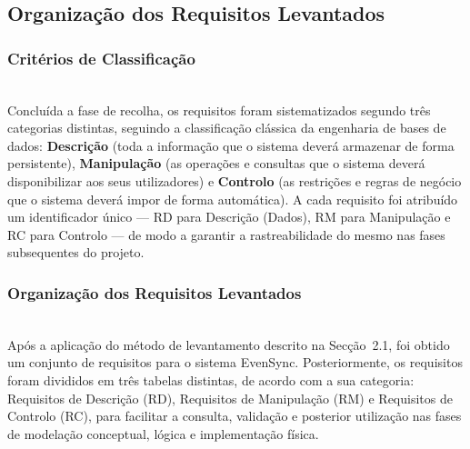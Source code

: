 \documentclass[runningheads]{llncs}
\begin{document}
                \newpage
                \subsection{Organização dos Requisitos Levantados}

                \subsubsection{Critérios de Classificação}\mbox{}\\

                Concluída a fase de recolha, os requisitos foram sistematizados segundo três categorias distintas,
                seguindo a classificação clássica da engenharia de bases de dados: \textbf{Descrição} (toda a informação
                que o sistema deverá armazenar de forma persistente), \textbf{Manipulação} (as operações e
                consultas que o sistema deverá disponibilizar aos seus utilizadores) e \textbf{Controlo}
                (as restrições e regras de negócio que o sistema deverá impor de forma automática). A cada
                requisito foi atribuído um identificador único --- RD para Descrição (Dados), RM para Manipulação e RC para
                Controlo --- de modo a garantir a rastreabilidade do mesmo nas fases subsequentes do projeto.

                \subsubsection{Organização dos Requisitos Levantados}\mbox{}\\

                Após a aplicação do método de levantamento descrito na Secção~2.1, foi obtido um conjunto
                de requisitos para o sistema EvenSync. Posteriormente, os requisitos foram divididos em três
                tabelas distintas, de acordo com a sua categoria: Requisitos de Descrição (RD), Requisitos de
                Manipulação (RM) e Requisitos de Controlo (RC), para facilitar a consulta, validação e posterior
                utilização nas fases de modelação conceptual, lógica e implementação física.
\end{document}
